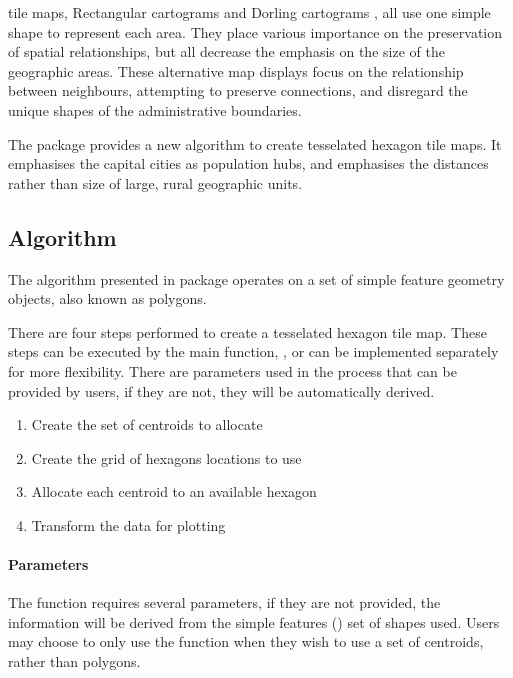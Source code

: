 \documentclass[
]{jss}
\providecommand{\tightlist}{%
  \setlength{\itemsep}{0pt}\setlength{\parskip}{0pt}}
\begin{document}
tile maps, Rectangular cartograms \citep{ORC} and Dorling cartograms
\citep{ACTUC}, all use one simple shape to represent each area. They
place various importance on the preservation of spatial relationships,
but all decrease the emphasis on the size of the geographic areas. These
alternative map displays focus on the relationship between neighbours,
attempting to preserve connections, and disregard the unique shapes of
the administrative boundaries.

The  package provides a new algorithm to create tesselated
hexagon tile maps. It emphasises the capital cities as population hubs,
and emphasises the distances rather than size of large, rural geographic
units.

\hypertarget{algorithm}{%
\subsection{Algorithm}\label{algorithm}}

The algorithm presented in  package operates on a set of
simple feature geometry objects, also known as  \citep{sf}
polygons.

There are four steps performed to create a tesselated hexagon tile map.
These steps can be executed by the main function, ,
or can be implemented separately for more flexibility. There are
parameters used in the process that can be provided by users, if they
are not, they will be automatically derived.

\begin{enumerate}
\def\labelenumi{\arabic{enumi}.}
\tightlist
\item
  Create the set of centroids to allocate
\item
  Create the grid of hexagons locations to use
\item
  Allocate each centroid to an available hexagon
\item
  Transform the data for plotting
\end{enumerate}

\hypertarget{parameters}{%
\paragraph{Parameters}\label{parameters}}

The  function requires several parameters, if they
are not provided, the information will be derived from the simple
features () set of shapes used. Users may choose to only use the
 function when they wish to use a set of centroids,
rather than  polygons.
\end{document}
